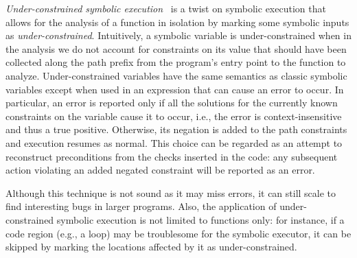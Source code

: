 {\em Under-constrained symbolic execution}~\cite{ED-ISSTA07} is a twist on symbolic execution that allows for the analysis of a function in isolation by marking some symbolic inputs as {\em under-constrained}. Intuitively, a symbolic variable is under-constrained when in the analysis we do not account for constraints on its value that should have been collected along the path prefix from the program's entry point to the function to analyze. Under-constrained variables have the same semantics as classic symbolic variables except when used in an expression that can cause an error to occur. In particular, an error is reported only if all the solutions for the currently known constraints on the variable cause it to occur, i.e., the error is context-insensitive and thus a true positive. Otherwise, its negation is added to the path constraints and execution resumes as normal. This choice can be regarded as an attempt to reconstruct preconditions from the checks inserted in the code: any subsequent action violating an added negated constraint will be reported as an error.


Although this technique is not sound as it may miss errors, it can still scale to find interesting bugs in larger programs. Also, the application of under-constrained symbolic execution is not limited to functions only: for instance, if a code region (e.g., a loop) may be troublesome for the symbolic executor, it can be skipped by marking the locations affected by it as under-constrained.

